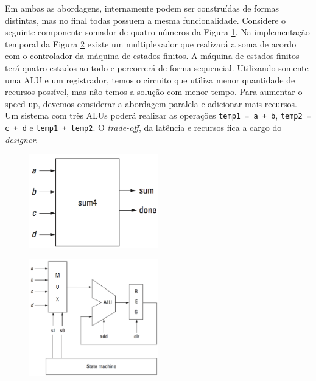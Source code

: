 Em ambas as abordagens, internamente podem ser construídas de formas distintas, mas no final todas possuem a mesma funcionalidade. Considere o seguinte componente somador de quatro números da Figura \ref{fig:f3-12}. Na implementação temporal da Figura \ref{fig:f3-13} existe um multiplexador que realizará a soma de acordo com o controlador da máquina de estados finitos. A máquina de estados finitos terá quatro estados ao todo e percorrerá de forma sequencial. Utilizando somente uma ALU e um registrador, temos o circuito que utiliza menor quantidade de recursos possível, mas não temos a solução com menor tempo. Para aumentar o speed-up, devemos considerar a abordagem paralela e adicionar mais recursos. Um sistema com três ALUs poderá realizar as operações \texttt{temp1 = a + b}, \texttt{temp2 = c + d} e \texttt{temp1 + temp2}. O \textit{trade-off}, da latência e recursos fica a cargo do \textit{\textit{design}er}.

\begin{figure}[h] \centering
	\includegraphics[width=0.5\textwidth]{img/f3-12.png}
	\caption{}
	\label{fig:f3-12}
\end{figure}

\begin{figure}[h] \centering
	\includegraphics[width=0.5\textwidth]{img/f3-13.png}
	\caption{}
	\label{fig:f3-13}
\end{figure}

